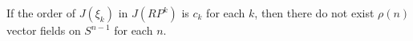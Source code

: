 If the order of $J(\xi_k)$ in $J(RP^k)$ is $c_k$ for each $k$, then there do not exist $\rho(n)$ vector fields on $S^{n-1}$ for each $n$.
